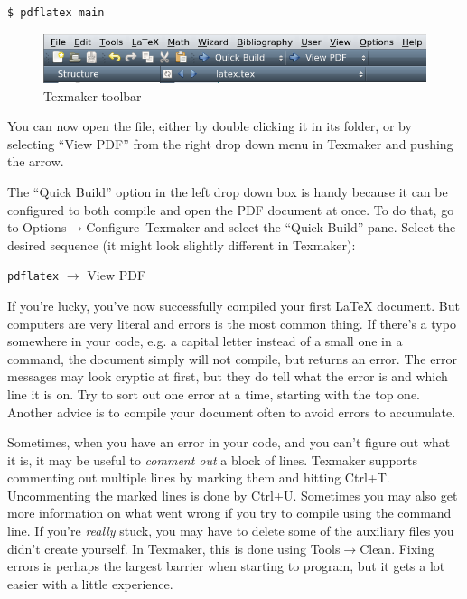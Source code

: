 \begin{verbatim}
$ pdflatex main
\end{verbatim}

\begin{figure}
	\centering
	\includegraphics[width=\textwidth]{graphics/texmaker.png}
	\caption{Texmaker toolbar}
	\label{fig:latex:texmaker}
\end{figure}

You can now open the file, either by double clicking it in its folder, or by selecting ``View PDF'' from the right drop down menu in Texmaker and pushing the arrow.

The ``Quick Build'' option in the left drop down box is handy because it can be configured to both compile and open the PDF document at once. To do that, go to Options$\rightarrow$Configure~Texmaker and select the ``Quick Build'' pane. Select the desired sequence (it might look slightly different in Texmaker):

\begin{center}
	\verb|pdflatex| $\rightarrow$ View PDF
\end{center}

If you're lucky, you've now successfully compiled your first \LaTeX{} document. But computers are very literal and errors is the most common thing. If there's a typo somewhere in your code, e.g. a capital letter instead of a small one in a command, the document simply will not compile, but returns an error. The error messages may look cryptic at first, but they do tell what the error is and which line it is on. Try to sort out one error at a time, starting with the top one. Another advice is to compile your document often to avoid errors to accumulate.

Sometimes, when you have an error in your code, and you can't figure out what it is, it may be useful to \emph{comment out} a block of lines. Texmaker supports commenting out multiple lines by marking them and hitting Ctrl+T. Uncommenting the marked lines is done by Ctrl+U.  Sometimes you may also get more information on what went wrong if you try to compile using the command line. If you're \emph{really} stuck, you may have to delete some of the auxiliary files you didn't create yourself. In Texmaker, this is done using Tools$\rightarrow$Clean. Fixing errors is perhaps the largest barrier when starting to program, but it gets a lot easier with a little experience.

